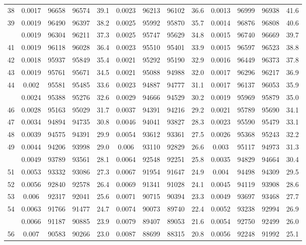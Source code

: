 \documentclass[
  14pt,
]{article}
\begin{document}
\begin{longtable}[t]{lcccccccccccc}
38 & 0.0017 & 96658 & 96574 & 39.1 & 0.0023 & 96213 & 96102 & 36.6 & 0.0013 & 96999 & 96938 & 41.6\\
39 & 0.0019 & 96490 & 96397 & 38.2 & 0.0025 & 95992 & 95870 & 35.7 & 0.0014 & 96876 & 96808 & 40.6\\
\addlinespace
40 & 0.0019 & 96304 & 96211 & 37.3 & 0.0025 & 95747 & 95629 & 34.8 & 0.0015 & 96740 & 96669 & 39.7\\
41 & 0.0019 & 96118 & 96028 & 36.4 & 0.0023 & 95510 & 95401 & 33.9 & 0.0015 & 96597 & 96523 & 38.8\\
42 & 0.0018 & 95937 & 95849 & 35.4 & 0.0021 & 95292 & 95190 & 32.9 & 0.0016 & 96449 & 96373 & 37.8\\
43 & 0.0019 & 95761 & 95671 & 34.5 & 0.0021 & 95088 & 94988 & 32.0 & 0.0017 & 96296 & 96217 & 36.9\\
44 & 0.002 & 95581 & 95485 & 33.6 & 0.0023 & 94887 & 94777 & 31.1 & 0.0017 & 96137 & 96053 & 35.9\\
\addlinespace
45 & 0.0024 & 95388 & 95276 & 32.6 & 0.0029 & 94666 & 94529 & 30.2 & 0.0019 & 95969 & 95879 & 35.0\\
46 & 0.0028 & 95163 & 95029 & 31.7 & 0.0037 & 94391 & 94216 & 29.2 & 0.0021 & 95789 & 95690 & 34.1\\
47 & 0.0034 & 94894 & 94735 & 30.8 & 0.0046 & 94041 & 93827 & 28.3 & 0.0023 & 95590 & 95479 & 33.1\\
48 & 0.0039 & 94575 & 94391 & 29.9 & 0.0054 & 93612 & 93361 & 27.5 & 0.0026 & 95368 & 95243 & 32.2\\
49 & 0.0044 & 94206 & 93998 & 29.0 & 0.006 & 93110 & 92829 & 26.6 & 0.003 & 95117 & 94973 & 31.3\\
\addlinespace
50 & 0.0049 & 93789 & 93561 & 28.1 & 0.0064 & 92548 & 92251 & 25.8 & 0.0035 & 94829 & 94664 & 30.4\\
51 & 0.0053 & 93332 & 93086 & 27.3 & 0.0067 & 91954 & 91647 & 24.9 & 0.004 & 94498 & 94309 & 29.5\\
52 & 0.0056 & 92840 & 92578 & 26.4 & 0.0069 & 91341 & 91028 & 24.1 & 0.0045 & 94119 & 93908 & 28.6\\
53 & 0.006 & 92317 & 92041 & 25.6 & 0.0071 & 90715 & 90394 & 23.3 & 0.0049 & 93697 & 93468 & 27.7\\
54 & 0.0063 & 91766 & 91477 & 24.7 & 0.0074 & 90073 & 89740 & 22.4 & 0.0052 & 93238 & 92994 & 26.9\\
\addlinespace
55 & 0.0066 & 91187 & 90885 & 23.9 & 0.0079 & 89407 & 89053 & 21.6 & 0.0054 & 92750 & 92499 & 26.0\\
56 & 0.007 & 90583 & 90266 & 23.0 & 0.0087 & 88699 & 88315 & 20.8 & 0.0056 & 92248 & 91992 & 25.1\\

\end{longtable}
\end{document}
